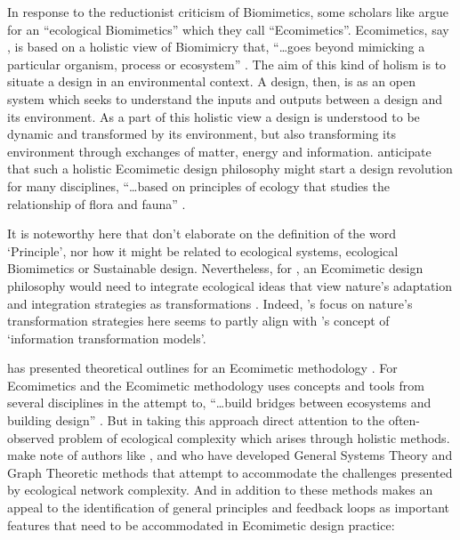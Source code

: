 In response to the reductionist criticism of Biomimetics, some scholars like \citeauthor{gamage_can_2011} argue for an ``ecological Biomimetics'' which they call ``Ecomimetics''. Ecomimetics, say \citeauthor{gamage_can_2011}, is based on a holistic view of Biomimicry that, ``\dots goes beyond mimicking a particular organism, process or ecosystem'' \cite[p.~1]{gamage_can_2011}. The aim of this kind of holism is to situate a design in an environmental context. A design, then, is as an open system which seeks to understand the inputs and outputs between a design and its environment. As a part of this holistic view a design is understood to be dynamic and transformed by its environment, but also transforming its environment through exchanges of matter, energy and information. \citeauthor{gamage_can_2011} anticipate that such a holistic Ecomimetic design philosophy might start a design revolution for many disciplines, ``\dots based on principles of ecology that studies the relationship of flora and fauna'' \cite[p.~2]{gamage_can_2011}. 

It is noteworthy here that \citeauthor{gamage_can_2011} don't elaborate on the definition of the word `Principle', nor how it might be related to ecological systems, ecological Biomimetics or Sustainable design. Nevertheless, for \citeauthor{gamage_can_2011}, an Ecomimetic design philosophy would need to integrate ecological ideas that view nature's adaptation and integration strategies as transformations \cite[p.~1]{gamage_can_2011}. Indeed, \citeauthor{gamage_can_2011}'s focus on nature's transformation strategies here seems to partly align with \citeauthor{schmitt_signals_1963}'s concept of `information transformation models'. 

\citeauthor{holguera_ecomimetics_2014} has presented theoretical outlines for an Ecomimetic methodology \citep{garcia-holguera_ecosystems_2013, holguera_ecomimetics_2014, garcia-holguera_ecomimetics_2018}. For \citeauthor{holguera_ecomimetics_2014} Ecomimetics and the Ecomimetic methodology uses concepts and tools from several disciplines in the attempt to, ``\dots build bridges between ecosystems and building design'' \citep[p.4]{holguera_ecomimetics_2014}. But in taking this approach \citeauthor{holguera_ecomimetics_2014} direct attention to the often-observed problem of ecological complexity which arises through holistic methods. \citeauthor{holguera_ecomimetics_2014} make note of authors like \cite{bertalanffy_outline_2008}, \cite{barabasi_emergence_1999} and \cite{anand_ecological_2010} who have developed General Systems Theory and Graph Theoretic methods that attempt to accommodate the challenges presented by ecological network complexity. And in addition to these methods \citeauthor{holguera_ecomimetics_2014} makes an appeal to the identification of general principles and feedback loops as important features that need to be accommodated in Ecomimetic design practice: 

